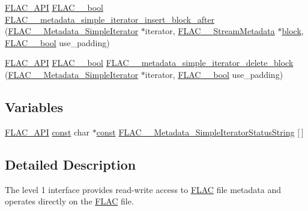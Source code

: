 \begin{DoxyCompactItemize}
\item 
\hyperlink{group__flac__export_ga56ca07df8a23310707732b1c0007d6f5}{F\+L\+A\+C\+\_\+\+A\+PI} \hyperlink{ordinals_8h_a95103469f1cbd78b8cf250194985b34e}{F\+L\+A\+C\+\_\+\+\_\+bool} \hyperlink{group__flac__metadata__level1_ga1239ccc5ae1dc3f7cb0e1a61707fafc6}{F\+L\+A\+C\+\_\+\+\_\+metadata\+\_\+simple\+\_\+iterator\+\_\+insert\+\_\+block\+\_\+after} (\hyperlink{struct_f_l_a_c_____metadata___simple_iterator}{F\+L\+A\+C\+\_\+\+\_\+\+Metadata\+\_\+\+Simple\+Iterator} $\ast$iterator, \hyperlink{struct_f_l_a_c_____stream_metadata}{F\+L\+A\+C\+\_\+\+\_\+\+Stream\+Metadata} $\ast$\hyperlink{structblock}{block}, \hyperlink{ordinals_8h_a95103469f1cbd78b8cf250194985b34e}{F\+L\+A\+C\+\_\+\+\_\+bool} use\+\_\+padding)
\item 
\hyperlink{group__flac__export_ga56ca07df8a23310707732b1c0007d6f5}{F\+L\+A\+C\+\_\+\+A\+PI} \hyperlink{ordinals_8h_a95103469f1cbd78b8cf250194985b34e}{F\+L\+A\+C\+\_\+\+\_\+bool} \hyperlink{group__flac__metadata__level1_gaf0a1823f95f8097f0d2ff3f67ae30a88}{F\+L\+A\+C\+\_\+\+\_\+metadata\+\_\+simple\+\_\+iterator\+\_\+delete\+\_\+block} (\hyperlink{struct_f_l_a_c_____metadata___simple_iterator}{F\+L\+A\+C\+\_\+\+\_\+\+Metadata\+\_\+\+Simple\+Iterator} $\ast$iterator, \hyperlink{ordinals_8h_a95103469f1cbd78b8cf250194985b34e}{F\+L\+A\+C\+\_\+\+\_\+bool} use\+\_\+padding)
\end{DoxyCompactItemize}
\subsection*{Variables}
\begin{DoxyCompactItemize}
\item 
\hyperlink{group__flac__export_ga56ca07df8a23310707732b1c0007d6f5}{F\+L\+A\+C\+\_\+\+A\+PI} \hyperlink{getopt1_8c_a2c212835823e3c54a8ab6d95c652660e}{const} char $\ast$\hyperlink{getopt1_8c_a2c212835823e3c54a8ab6d95c652660e}{const} \hyperlink{group__flac__metadata__level1_ga28ea4a13fcbe97a732fafb13417036bb}{F\+L\+A\+C\+\_\+\+\_\+\+Metadata\+\_\+\+Simple\+Iterator\+Status\+String} \mbox{[}$\,$\mbox{]}
\end{DoxyCompactItemize}


\subsection{Detailed Description}
The level 1 interface provides read-\/write access to \hyperlink{namespace_f_l_a_c}{F\+L\+AC} file metadata and operates directly on the \hyperlink{namespace_f_l_a_c}{F\+L\+AC} file. 

